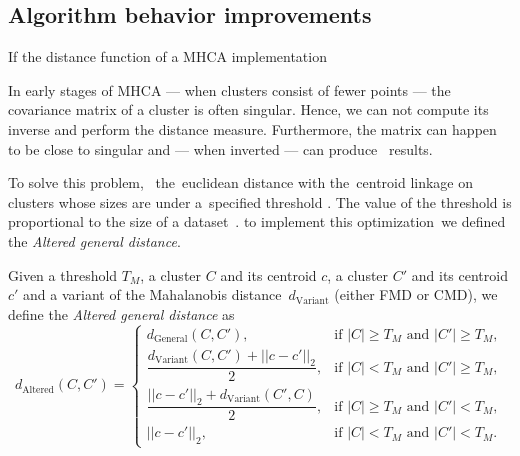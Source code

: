\subsection{Algorithm behavior improvements}

If the distance function of a MHCA implementation 

In early stages of MHCA --- when clusters consist of fewer points --- the covariance matrix of a cluster is often singular. Hence, we can not compute its inverse and perform the distance measure. Furthermore, the matrix can happen to be close to singular and --- when inverted --- can produce \ results.

To solve this problem, \ the~euclidean distance with the~centroid linkage on clusters whose sizes are under a~specified threshold . The value of the threshold is proportional to the size of a dataset~\cite{fivser2012detection}.  to implement this optimization\ we defined the \emph{Altered general distance}.

\begin{defn}
	Given a threshold $T_M$, a cluster $C$ and its centroid $c$, a cluster $C'$ and its centroid $c'$ and a variant of the Mahalanobis distance~$d_\text{Variant}$ (either FMD or CMD), we define the \emph{Altered general distance} as
	$$
	d_\text{Altered}(C,C')=
	\begin{cases}
		d_\text{General}(C, C'),                       & \text{if $|C|\ge T_M$ and $|C'|\ge T_M$}, \\
		\dfrac{d_\text{Variant}(C, C')+||c-c'||_2}{2}, & \text{if $|C| < T_M$ and $|C'|\ge T_M$},  \\
		\dfrac{||c-c'||_2+d_\text{Variant}(C', C)}{2}, & \text{if $|C|\ge T_M$ and $|C'|< T_M$},   \\
		||c-c'||_2,                                    & \text{if $|C|< T_M$ and $|C'|< T_M$}.
	\end{cases}
	$$
	\label{def01:alt}
\end{defn}



